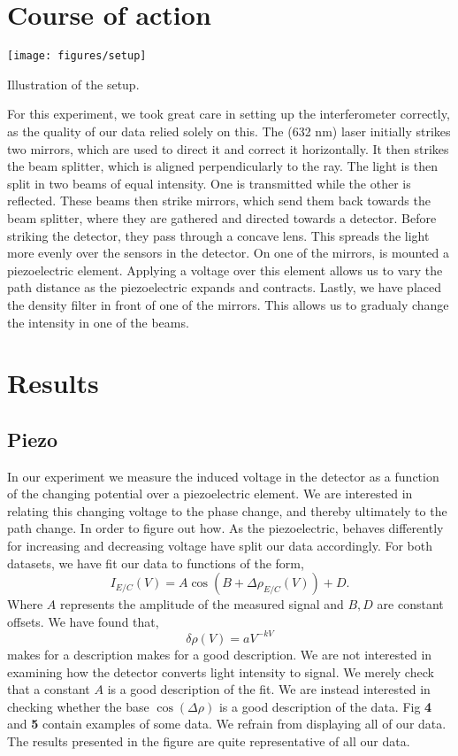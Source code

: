 \documentclass[working, oneside]{inputs/tuftebook}
\begin{document}
\section*{Course of action}
\begin{marginfigure}
	\texttt{[image: figures/setup]}
	\caption{Illustration of the setup.}
\end{marginfigure}
		For this experiment, we took great care in setting up the interferometer correctly, as the quality of our data relied solely on this. The (632 nm) laser initially strikes two mirrors, which are used to direct it and correct it horizontally. It then strikes the beam splitter, which is aligned perpendicularly to the ray. The light is then split in two beams of equal intensity. One is transmitted while the other is reflected. These beams then strike mirrors, which send them back towards the beam splitter, where they are gathered and directed towards a detector. Before striking the detector, they pass through a concave lens. This spreads the light more evenly over the sensors in the detector. On one of the mirrors, is mounted a piezoelectric element. Applying a voltage over this element allows us to vary the path distance as the piezoelectric expands and contracts. Lastly, we have placed the density filter in front of one of the mirrors. This allows us to gradualy change the intensity in one of the beams.
\section*{Results}
\subsection*{Piezo}
In our experiment we measure the induced voltage in the detector as a function of the changing potential over a piezoelectric element. We are interested in relating this changing voltage to the phase change, and thereby ultimately to the path change. In order to figure out how. As the piezoelectric, behaves differently for increasing and decreasing voltage have split our data accordingly. For both datasets, we have fit our data to functions of the form,
\[
	I_{E /C} \left( V \right) = A \cos \left( B + \Delta \rho_{E /C}\left( V \right)  \right) +D
.\] 
Where $A$ represents the amplitude of the measured signal and $B, D$ are constant offsets. We have found that,
\[
\delta \rho \left( V \right) = aV^{-kV}
\] makes for a description makes for a good description. We are not interested in examining how the detector converts light intensity to signal. We merely check that a constant $A$ is a good description of the fit. We are instead interested in checking whether the base $\cos\left( \Delta \rho  \right) $ is a good description of the data. Fig \textbf{4} and \textbf{5} contain examples of some data. We refrain from displaying all of our data. The results presented in the figure are quite representative of all our data.
\end{document}
